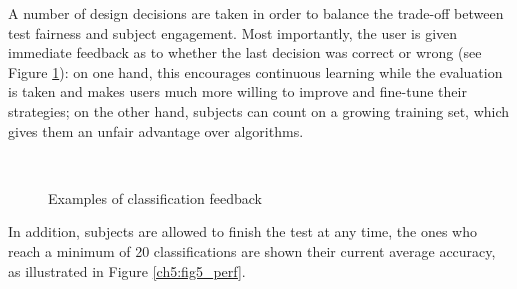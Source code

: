 A number of design decisions are taken in order to balance the trade-off between test fairness and subject engagement. Most importantly, the user is given
immediate feedback as to whether the last decision was correct or wrong (see Figure \ref{ch5:fig4_fb}): on one hand, this encourages continuous learning while the evaluation is taken and
makes users much more willing to improve and fine-tune their strategies; on the other hand, subjects can count on a growing training set, which gives them an
unfair advantage over algorithms.

\begin{figure}[!hbt]
  \centering
    \\
    \caption{Examples of classification feedback}
    \label{ch5:fig4_fb}
\end{figure}


In addition, subjects are allowed to finish the test at any time, the ones who reach a minimum of 20 classifications are shown their
current average accuracy, as illustrated in Figure \ref{ch5:fig5_perf}.

